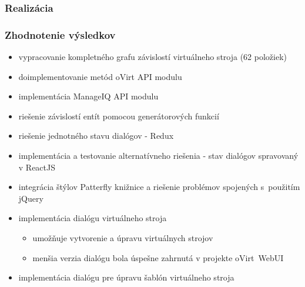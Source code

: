 \documentclass[pdf]{beamer}
\begin{document}
\begin{frame}
\frametitle{Realizácia}

\begin{figure}[h]
\label{labelledSelect}
\end{figure}

\begin{figure}[h]
\label{labelledSelect}
\end{figure} 

\begin{figure}[h]
\label{labelledSelect}
\end{figure} 


\begin{figure}[h]
\label{labelledSelect}
\end{figure}

\end{frame}

\begin{frame}
\frametitle{Zhodnotenie výsledkov}

\begin{itemize}
\item vypracovanie kompletného grafu závislostí virtuálneho stroja (62 položiek)
\item doimplementovanie metód oVirt API modulu
\item implementácia ManageIQ API modulu
\item riešenie závislostí entít pomocou generátorových funkcií
\item riešenie jednotného stavu dialógov - Redux
\item implementácia a testovanie alternatívneho riešenia - stav dialógov spravovaný v ReactJS
\item integrácia štýlov Patterfly knižnice a riešenie problémov spojených s~použitím jQuery
\item implementácia dialógu virtuálneho stroja
\begin{itemize}
\item umožňuje vytvorenie a úpravu virtuálnych strojov
\item menšia verzia dialógu bola úspešne zahrnutá v projekte oVirt~WebUI
\end{itemize}
\item implementácia dialógu pre úpravu šablón virtuálneho stroja
\end{itemize}

\end{frame}
\end{document}
